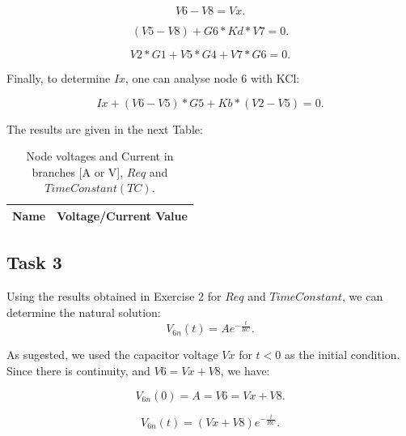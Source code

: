 \begin{equation}
  V6 - V8 = Vx.
  \label{eq:n52}
\end{equation}

\begin{equation}
  (V5 - V8) + G6*Kd*V7 = 0.
  \label{eq:n62}
\end{equation}

\begin{equation}
  V2*G1 + V5*G4 + V7*G6 = 0.
  \label{eq:n72}
\end{equation}

Finally, to determine $Ix$, one can analyse node 6 with KCl:

\begin{equation}
  Ix + (V6 - V5)*G5 + Kb*(V2 - V5) = 0.
  \label{eq:Ix}
\end{equation}

The results are given in the next Table: 

 \begin{table}[h]
  \centering
  \begin{tabular}{|l|r|}
    \hline    
    {\bf Name} & {\bf Voltage/Current Value}\\ \hline
    
  \end{tabular}
  \caption{Node voltages and Current in branches [A or V], $Req$ and $Time Constant(TC)$.}
  \label{tab:r2}
\end{table}

\newpage

\subsection{Task 3}

\par Using the results obtained in Exercise 2 for $Req$ and $Time Constant$, we can determine the natural solution:
 \begin{equation}
  V_{6n}(t) = Ae^{-\frac{t}{RC}}.
  \label{eq:v6n}
\end{equation}

\par As sugested, we used the capacitor voltage $Vx$ for $t<0$ as the initial condition. Since there is continuity, and $V6 = Vx + V8$, we have:

\begin{equation}
  V_{6n}(0) = A = V6 = Vx + V8.
  \label{eq:e31}
\end{equation}

\begin{equation}
  V_{6n}(t) = (Vx + V8)e^{-\frac{t}{RC}}.
  \label{eq:e32}
\end{equation}


